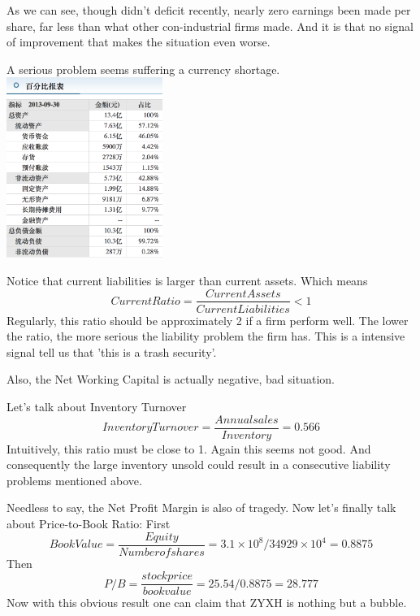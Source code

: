 \documentclass{article}
\begin{document}
As we can see, though didn't deficit recently, nearly zero earnings been made per share, far less than what other con-industrial firms made. And it is that no signal of improvement that makes the situation even worse.

A serious problem seems suffering a currency shortage.\\
\includegraphics[width=2in]{percent}

Notice that current liabilities is larger than current assets. Which means 
\[
    Current Ratio = \frac{CurrentAssets}{CurrentLiabilities} < 1
\]
Regularly, this ratio should be approximately 2 if a firm perform well. The lower the ratio, the more serious the liability problem the firm has. This is a intensive signal tell us that 'this is a trash security'.

Also, the Net Working Capital is actually negative, bad situation.

Let's talk about Inventory Turnover
\[
    Inventory Turnover = \frac{Annual sales}{Inventory} = 0.566
\]
Intuitively, this ratio must be close to 1. Again this seems not good. And consequently the large inventory unsold could result in a consecutive liability problems mentioned above.

Needless to say, the Net Profit Margin is also of tragedy. Now let's finally talk about Price-to-Book Ratio:
First
\[
    Book Value = \frac{Equity}{Number of shares} = 3.1\times 10^8 / 34929 \times 10^4 =0.8875 
\]
Then
\[
    P/B = \frac{stock price}{book value} = 25.54/0.8875=28.777
\]
Now with this obvious result one can claim that ZYXH is nothing but a bubble. 
\end{document}
